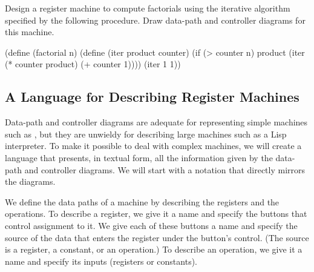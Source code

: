 \begin{exercise}
	\label{Exercise 5.1}
	Design a register machine to compute factorials using the iterative algorithm specified by the following procedure.
	Draw data-path and controller diagrams for this machine.
	\begin{scheme}
	  (define (factorial n)
	    (define (iter product counter)
	      (if (> counter n)
	          product
	          (iter (* counter product)
	                (+ counter 1))))
	    (iter 1 1))
	\end{scheme}
\end{exercise}



\subsection{A Language for Describing Register Machines}
\label{Section 5.1.1}

Data-path and controller diagrams are adequate for representing simple machines such as , but they are unwieldy for describing large machines such as a Lisp interpreter.
To make it possible to deal with complex machines, we will create a language that presents, in textual form, all the information given by the data-path and controller diagrams.
We will start with a notation that directly mirrors the diagrams.

We define the data paths of a machine by describing the registers and the operations.
To describe a register, we give it a name and specify the buttons that control assignment to it.
We give each of these buttons a name and specify the source of the data that enters the register under the button’s control.
(The source is a register, a constant, or an operation.)
To describe an operation, we give it a name and specify its inputs (registers or  constants).

